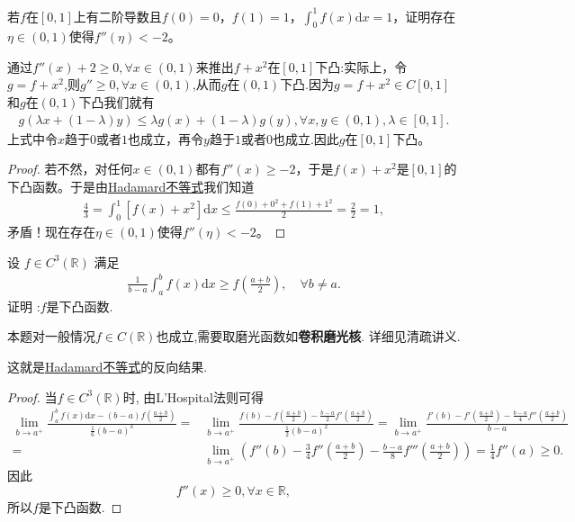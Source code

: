 \documentclass[../../main.tex]{subfiles}%
\begin{document}
\begin{example}
若$f$在$[0,1]$上有二阶导数且$f(0) = 0$，$f(1) = 1$，$\int_0^1 f(x)\mathrm{d}x = 1$，证明存在$\eta\in(0,1)$使得$f''(\eta)< -2$。
\end{example}
\begin{remark}
通过$f''(x)+2\geqslant  0,\forall x\in(0,1)$来推出$f + x^2$在$[0,1]$下凸:实际上，令$g=f+x^2$,则$g''\geqslant  0,\forall x\in(0,1)$,从而$g$在$(0,1)$下凸.因为$g = f + x^2\in C[0,1]$和$g$在$(0,1)$下凸我们就有
\begin{align*}
g(\lambda x + (1 - \lambda)y)\leqslant \lambda g(x) + (1 - \lambda)g(y),\forall x,y\in(0,1),\lambda\in[0,1].
\end{align*}
上式中令$x$趋于$0$或者$1$也成立，再令$y$趋于$1$或者$0$也成立.因此$g$在$[0,1]$下凸。 
\end{remark}
\begin{proof}

若不然，对任何$x\in(0,1)$都有$f''(x)\geqslant  -2$，于是$f(x) + x^2$是$[0,1]$的下凸函数。于是由\hyperref[theorem:Hadamard不等式]{Hadamard不等式}我们知道
\begin{align*}
\frac{4}{3}=\int_0^1 [f(x) + x^2]\mathrm{d}x\leqslant \frac{f(0) + 0^2 + f(1) + 1^2}{2}=\frac{2}{2}=1,
\end{align*}
矛盾！现在存在$\eta\in(0,1)$使得$f''(\eta)< -2$。

\end{proof}

\begin{proposition}
设 \(f\in C^3(\mathbb{R})\) 满足
\begin{align*}
\frac{1}{b - a}\int_{a}^{b}f(x)\mathrm{d}x \geqslant f\left(\frac{a + b}{2}\right),\quad \forall b\neq a.
\end{align*}
证明 :\(f\)是下凸函数. 
\end{proposition}
\begin{remark}
本题对一般情况$f\in C(\mathbb{R})$也成立,需要取磨光函数如\textbf{卷积磨光核}. 详细见清疏讲义.
\end{remark}
\begin{note}
这就是\hyperref[theorem:Hadamard不等式]{Hadamard不等式}的反向结果.
\end{note}
\begin{proof}

当\(f\in C^{3}(\mathbb{R})\)时, 由L'Hospital法则可得
\begin{align*}
\lim_{b\rightarrow a^+} \frac{\int_a^b{f(x)\mathrm{d}x}-(b-a)f(\frac{a+b}{2})}{\frac{1}{6}(b-a)^3}=&\lim_{b\rightarrow a^+} \frac{f(b)-f(\frac{a+b}{2})-\frac{b-a}{2}f\prime (\frac{a+b}{2})}{\frac{1}{2}(b-a)^2}=\lim_{b\rightarrow a^+} \frac{f\prime (b)-f\prime (\frac{a+b}{2})-\frac{b-a}{4}f'' (\frac{a+b}{2})}{b-a}\\
=&\lim_{b\rightarrow a^+} \left( f'' (b)-\frac{3}{4}f'' \left( \frac{a+b}{2} \right) -\frac{b-a}{8}f''' \left( \frac{a+b}{2} \right) \right) =\frac{1}{4}f'' (a)\geqslant 0.
\end{align*}
因此
\[f''(x)\geqslant 0,\forall x\in \mathbb{R},\]
所以\(f\)是下凸函数.

\end{proof}
\end{document}
